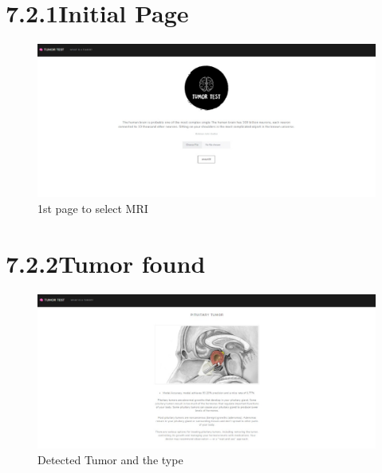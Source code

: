 \documentclass[oneside,a4paper,12pt]{book}
\begin{document}
\begin{appendices}
\section*{7.2.1\hspace*{10pt}Initial Page}
\begin{Center}
\begin{figure}[H]
	\begin{Center}
		\includegraphics[width=\linewidth]{initial_page.jpeg}
		\caption{1st page to select MRI }
		\label{fig:EndorsersCommitters_Role}
	\end{Center}
\end{figure}
\end{Center}\par

\section*{7.2.2\hspace*{10pt}Tumor found}
\begin{Center}
\begin{figure}[H]
	\begin{Center}
		\includegraphics[width=\linewidth]{tumor_found_type_.jpeg}
		\caption{Detected Tumor and the type }
		\label{fig:EndorsersCommitters_Role}
	\end{Center}
\end{figure}
\end{Center}\par


\end{appendices}
\end{document}

